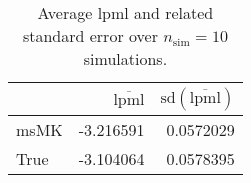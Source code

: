 \begin{table}[H]

\caption{Average lpml and related standard error over $n_{\text{sim}} = 10$ simulations.}
\centering
\begin{tabular}[t]{lrr}
\toprule
  & $\overbar{\text{lpml}}$ & $\text{sd}(\overbar{\text{lpml}})$\\
\midrule
msMK & -3.216591 & 0.0572029\\
True & -3.104064 & 0.0578395\\
\bottomrule
\end{tabular}
\end{table}